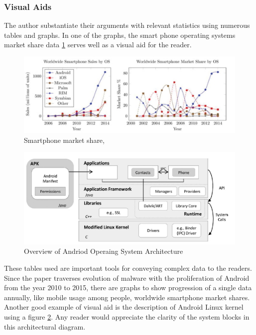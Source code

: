 \documentclass[12pt]{article}
\begin{document}
\subsubsection{Visual Aids}
The author substantiate their arguments with relevant statistics using numerous tables and graphs. In one of the graphs, the smart phone operating systems market share data \ref{lbl_smartphone_market_share} serves well as a visual aid for the reader.
\begin{figure}[h!]
        \centerline{\includegraphics[scale=0.45]{smartphonemarketshare.PNG}}
        \label{lbl_smartphone_market_share}
        \caption{Smartphone market share, ~\cite[fig 1]{Tam:2017:EAM:3022634.3017427}}
\end{figure}
\begin{figure}[h!]
        \centerline{\includegraphics[scale=0.45]{androidlinuxkernel.PNG}}
        \caption{Overview of Andriod Operaing System Architecture ~\cite[fig 2]{Tam:2017:EAM:3022634.3017427}}
        \label{lbl_linux_kernl}
\end{figure}
These tables used are important tools for conveying complex data to the readers. Since the paper traverses evolution of malware with the proliferation of Android from the year 2010 to 2015, there are graphs to show progression of a single data annually, like mobile usage among people, worldwide smartphone market shares. Another good example of visual aid is the description of Android Linux kernel using a figure \ref{lbl_linux_kernl}. Any reader would appreciate the clarity of the system blocks in this architectural diagram. \\
\end{document}
